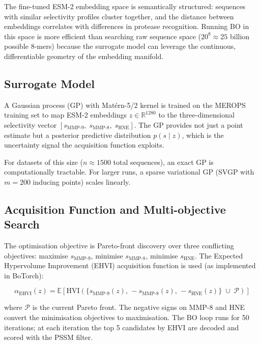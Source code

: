 \documentclass[10pt,a4paper]{article}
\begin{document}
The fine-tuned ESM-2 embedding space is semantically structured: sequences with
similar selectivity profiles cluster together, and the distance between embeddings
correlates with differences in protease recognition.  Running BO in this space
is more efficient than searching raw sequence space ($20^8 \approx 25$ billion
possible 8-mers) because the surrogate model can leverage the continuous,
differentiable geometry of the embedding manifold.

\subsection{Surrogate Model}

A Gaussian process (GP) with Mat\'{e}rn-5/2 kernel is trained on the MEROPS
training set to map ESM-2 embeddings $z \in \mathbb{R}^{1280}$ to the
three-dimensional selectivity vector $[s_{\text{MMP-9}},\; s_{\text{MMP-8}},\; s_{\text{HNE}}]$.
The GP provides not just a point estimate but a posterior predictive distribution
$p(s \mid z)$, which is the uncertainty signal the acquisition function exploits.

For datasets of this size ($n \approx 1500$ total sequences), an exact GP is
computationally tractable.  For larger runs, a sparse variational GP
(SVGP with $m = 200$ inducing points) scales linearly.

\subsection{Acquisition Function and Multi-objective Search}

The optimisation objective is Pareto-front discovery over three conflicting
objectives: maximise $s_{\text{MMP-9}}$, minimise $s_{\text{MMP-8}}$,
minimise $s_{\text{HNE}}$.  The Expected Hypervolume Improvement (EHVI)
acquisition function is used (as implemented in BoTorch):

\begin{equation}
  \alpha_{\mathrm{EHVI}}(z) =
  \mathbb{E}\!\left[\mathrm{HVI}\!\left(
    \{s_{\text{MMP-9}}(z),\, -s_{\text{MMP-8}}(z),\, -s_{\text{HNE}}(z)\}
    \;\cup\; \mathcal{P}
  \right)\right]
\end{equation}

where $\mathcal{P}$ is the current Pareto front.  The negative signs on
MMP-8 and HNE convert the minimisation objectives to maximisation.
The BO loop runs for 50 iterations; at each iteration the top 5 candidates
by EHVI are decoded and scored with the PSSM filter.
\end{document}
